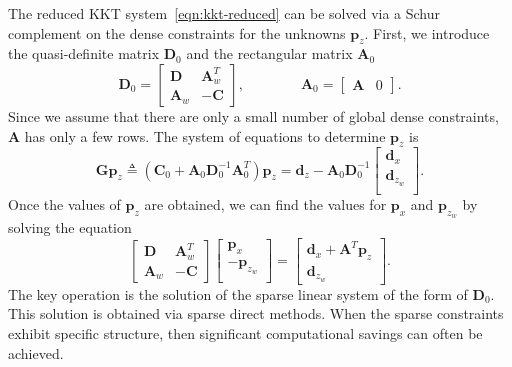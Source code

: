 \documentclass[12pt]{article}
\newcommand{\mb}{\mathbf}
\begin{document}
The reduced KKT system~\eqref{eqn:kkt-reduced} can be solved via a Schur complement on the dense constraints for the unknowns $\mb{p}_{z}$.
First, we introduce the quasi-definite matrix $\mb{D}_{0}$ and the rectangular matrix $\mb{A}_{0}$
\begin{equation*}
	\mb{D}_{0} = 
	\begin{bmatrix} 
	\mb{D} & \mb{A}_{w}^{T} \\
	\mb{A}_{w} & - \mb{C} 
	\end{bmatrix},
	\qquad\qquad
	\mb{A}_{0} = \begin{bmatrix} \mb{A} & 0 \end{bmatrix}.
\end{equation*}
Since we assume that there are only a small number of global dense constraints, $\mb{A}$ has only a few rows. 
%
The system of equations to determine $\mb{p}_{z}$ is 
%
\begin{equation*}
	\mb{G} \mb{p}_{z} \triangleq \left( \mb{C}_{0} + \mb{A}_{0} \mb{D}_{0}^{-1} \mb{A}_{0}^{T} \right)  \mb{p}_{z} = \mb{d}_{z} - \mb{A}_{0} \mb{D}_{0}^{-1} \begin{bmatrix} 
	\mb{d}_{x} \\
	\mb{d}_{z_{w}} \\
	\end{bmatrix}.
\end{equation*}
Once the values of $\mb{p}_{z}$ are obtained, we can find the values for $\mb{p}_{x}$ and $\mb{p}_{z_{w}}$ by solving the equation
%
\begin{equation*}
	\begin{bmatrix} 
	\mb{D} & \mb{A}_{w}^{T} \\
	\mb{A}_{w} & - \mb{C} 
	\end{bmatrix}
	\begin{bmatrix}
		\mb{p}_{x} \\
		-\mb{p}_{z_{w}} \\
	\end{bmatrix} = 
	\begin{bmatrix}
	\mb{d}_{x} + \mb{A}^{T} \mb{p}_{z} \\
	\mb{d}_{z_{w}}
	\end{bmatrix}.
\end{equation*}
%
The key operation is the solution of the sparse linear system of the form of $\mb{D}_{0}$.
This solution is obtained via sparse direct methods. 
When the sparse constraints exhibit specific structure, then significant computational savings can often be achieved.
\end{document}
